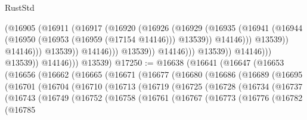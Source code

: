 \begin{lexlean}{RustStd}
\begin{coremodule}
                                              (@16905
                                                (@16911
                                                  (@16917
                                                    (@16920
                                                      (@16926
                                                        (@16929
                                                          (@16935
                                                            (@16941
                                                              (@16944
                                                                (@16950
                                                                  (@16953 (@16959 (@17154 @14146)))
                                                                  @13539))
                                                              @14146)))
                                                        @13539))
                                                    @14146)))
                                              @13539))
                                          @14146)))
                                    @13539))
                                @14146)))
                          @13539))
                      @14146)))
                @13539))
            @14146)))
      @13539)
@17250 := @16638
    (@16641
      (@16647
        (@16653
          (@16656
            (@16662
              (@16665
                (@16671
                  (@16677
                    (@16680
                      (@16686
                        (@16689
                          (@16695
                            (@16701
                              (@16704
                                (@16710
                                  (@16713
                                    (@16719
                                      (@16725
                                        (@16728
                                          (@16734
                                            (@16737
                                              (@16743
                                                (@16749
                                                  (@16752
                                                    (@16758
                                                      (@16761
                                                        (@16767
                                                          (@16773
                                                            (@16776
                                                              (@16782
                                                                (@16785

\end{coremodule}
\end{lexlean}
